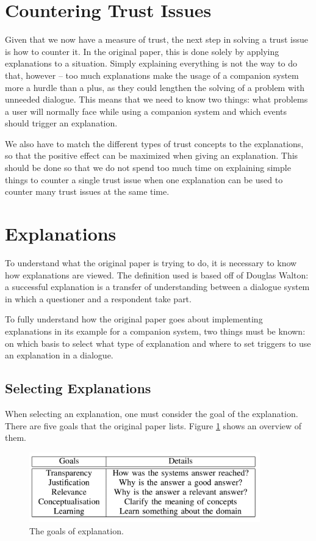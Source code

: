 \documentclass[a4paper]{article}
\begin{document}
\section{Countering Trust Issues}

Given that we now have a measure of trust, the next step in solving a trust issue is how to counter it. In the original paper, this is done solely by applying explanations to a situation. Simply explaining everything is not the way to do that, however – too much explanations make the usage of a companion system more a hurdle than a plus, as they could lengthen the solving of a problem with unneeded dialogue. This means that we need to know two things: what problems a user will normally face while using a companion system and which events should trigger an explanation.

We also have to match the different types of trust concepts to the explanations, so that the positive effect can be maximized when giving an explanation. This should be done so that we do not spend too much time on explaining simple things to counter a single trust issue when one explanation can be used to counter many trust issues at the same time.

\section{Explanations}

To understand what the original paper is trying to do, it is necessary to know how explanations are viewed. The definition used is based off of Douglas Walton: a successful explanation is a transfer of understanding between a dialogue system in which a questioner and a respondent take part\cite{walton2004new}. 

To fully understand how the original paper goes about implementing explanations in its example for a companion system, two things must be known: on which basis to select what type of explanation and where to set triggers to use an explanation in a dialogue.

\subsection{Selecting Explanations}

When selecting an explanation, one must consider the goal of the explanation. There are five goals that the original paper lists. Figure \ref{fig:goals} shows an overview of them.

\begin{figure}[H]
	\centering
	\includegraphics[width=10cm]{goals.png}
	\caption{The goals of explanation.}
	\label{fig:goals}
\end{figure}
\end{document}
